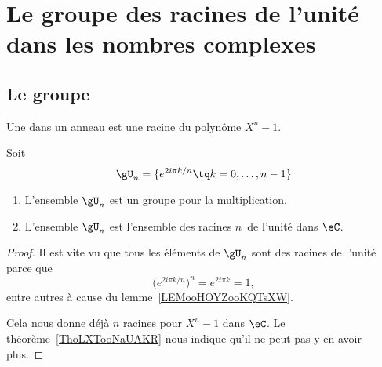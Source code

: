 
\section{Le groupe des racines de l'unité dans les nombres complexes}
\label{SecGJOLooWdMYVl}

\subsection{Le groupe}

\begin{definition}      \label{DEFooDUWPooZaAByH}
    Une  dans un anneau est une racine du polynôme \( X^n-1\).
\end{definition}

\begin{lemmaDef}        \label{LEMooSXFBooYJmRTK}
    Soit
    \begin{equation}        \label{EqIEAXooIpvFPe}
        \gU_n=\{  e^{2i\pi k/n}  \tq k=0,\ldots, n-1 \}
    \end{equation}
    \begin{enumerate}
        \item
            L'ensemble \( \gU_n\) est un groupe pour la multiplication.
        \item
            L'ensemble \( \gU_n\) est l'ensemble des racines \( n\)\ieme\ de l'unité dans \( \eC\).
    \end{enumerate}
\end{lemmaDef}

\begin{proof}
    Il est vite vu que tous les éléments de \( \gU_n\) sont des racines de l'unité parce que
    \begin{equation}
        \big(  e^{2i\pi k/n} \big)^n= e^{2i\pi k}=1,
    \end{equation}
    entre autres à cause du lemme~\ref{LEMooHOYZooKQTsXW}.

    Cela nous donne déjà \( n\) racines pour \( X^n-1\) dans \( \eC\). Le théorème~\ref{ThoLXTooNaUAKR} nous indique qu'il ne peut pas y en avoir plus.
\end{proof}

